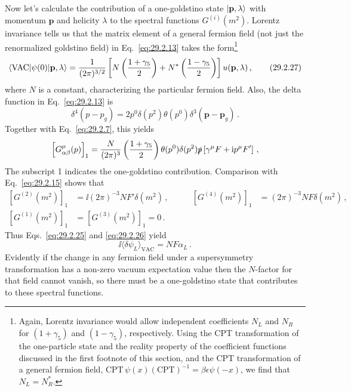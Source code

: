 Now let's calculate the contribution of a one-goldstino state
\(\lvert \mathbf p,\lambda\rangle\) with momentum \(\mathbf p\) and
helicity \(\lambda\) to the spectral functions \(G^{(i)}(m^2)\). Lorentz
invariance tells us that the matrix element of a general fermion field
(not just the renormalized goldstino field) in Eq.~\eqref{eq:29.2.13}
takes the form\footnote{Again, Lorentz invariance would allow independent
coefficients \(N_L\) and \(N_R\) for \((1+\gamma_5)\) and
\((1-\gamma_5)\), respectively. Using the CPT transformation of the
one-particle state and the reality property of the coefficient functions
discussed in the first footnote of this section, and the CPT
transformation of a general fermion field,
\(\mathrm{CPT}\,\psi(x)(\mathrm{CPT})^{-1}
=\beta\epsilon\psi(-x)\), we find that \(N_L=N_R^*\).}
\begin{equation}
  \langle \mathrm{VAC}\rvert\psi(0)\lvert \mathbf p,\lambda\rangle
  =
  \frac1{(2\pi)^{3/2}}
  \left[
    N\left(\frac{1+\gamma_5}{2}\right)
    +N^*\left(\frac{1-\gamma_5}{2}\right)
  \right]u(\mathbf p,\lambda)\,,
  \tag{29.2.27}\label{eq:29.2.27}
\end{equation}
where \(N\) is a constant, characterizing the particular fermion field.
Also, the delta function in Eq.~\eqref{eq:29.2.13} is
\[
  \delta^4(p-p_g)
  =2p^0\delta(p^2)\theta(p^0)
    \delta^3(\mathbf p-\mathbf p_g)\,.
\]
Together with Eq.~\eqref{eq:29.2.7}, this yields
\[
  \left[G^\mu_{\alpha\beta}(p)\right]_1
  =
  \frac{N}{(2\pi)^3}
  \left(\frac{1+\gamma_5}{2}\right)
  \theta(p^0)\delta(p^2)\slashed{p}
  \left[\gamma^\mu F+\mathrm{i} p^\mu F'\right]\,,
\]
The subscript 1 indicates the one-goldstino contribution. Comparison with
Eq.~\eqref{eq:29.2.15} shows that
\begin{equation}
  \begin{aligned}
  \left[G^{(2)}(m^2)\right]_1
  &=\ii(2\pi)^{-3}NF'\delta(m^2)\,,
  &\qquad
  \left[G^{(4)}(m^2)\right]_1
  &=(2\pi)^{-3}NF\delta(m^2)\,,
  \\
  \left[G^{(1)}(m^2)\right]_1
  &=\left[G^{(3)}(m^2)\right]_1=0\,.
  \end{aligned}
  \tag{29.2.28}\label{eq:29.2.28}
\end{equation}
Thus Eqs.~\eqref{eq:29.2.25} and \eqref{eq:29.2.26} yield
\begin{equation}
  \ii\langle\delta\psi_L\rangle_{\mathrm{VAC}}
  =NF\alpha_L\,.
  \tag{29.2.29}\label{eq:29.2.29}
\end{equation}
Evidently if the change in any fermion field under a supersymmetry
transformation has a non-zero vacuum expectation value then the
\(N\)-factor for that field cannot vanish, so there must be a
one-goldstino state that contributes to these spectral functions.

